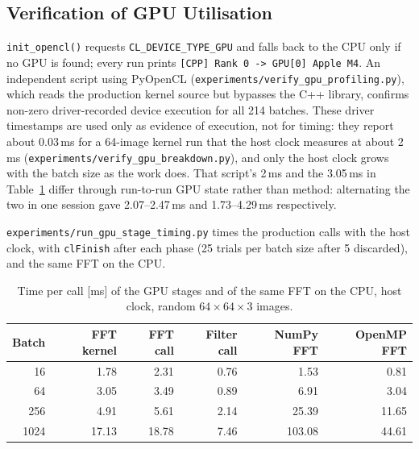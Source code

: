 \documentclass[a4paper,12pt]{report}
\begin{document}
\subsection{Verification of GPU Utilisation}
\label{sec:gpu-idle-check}

\texttt{init\_\discretionary{}{}{}opencl()} requests
\texttt{CL\_\discretionary{}{}{}DEVICE\_\discretionary{}{}{}TYPE\_\discretionary{}{}{}GPU} and falls back to the CPU only if
no GPU is found; every run prints \texttt{[CPP] Rank~0 -> GPU[0]
Apple~M4}. An independent script using PyOpenCL
(\texttt{experiments\slash{}verify\_\discretionary{}{}{}gpu\_\discretionary{}{}{}profiling.py}), which reads
the production kernel source but bypasses the C++ library, confirms
non-zero driver-recorded device execution for all 214 batches. These
driver timestamps are used only as evidence of execution, not for
timing: they report about 0.03\,ms for a 64-image kernel run that the host
clock measures at about 2\,ms
(\texttt{experiments\slash{}verify\_\discretionary{}{}{}gpu\_\discretionary{}{}{}breakdown.py}), and only the
host clock grows with the batch size as the work does. That script's 2\,ms and
the 3.05\,ms in Table~\ref{tab:gpu-device-breakdown} differ through run-to-run
GPU state rather than method: alternating the two in one session gave
2.07--2.47\,ms and 1.73--4.29\,ms respectively.

\texttt{experiments\slash{}run\_\discretionary{}{}{}gpu\_\discretionary{}{}{}stage\_\discretionary{}{}{}timing.py} times the
production calls with the host clock, with \texttt{clFinish} after each
phase (25 trials per batch size after 5 discarded), and the same FFT on
the CPU.

\begin{table}[H]
\centering
\caption{Time per call [ms] of the GPU stages and of the same FFT on the
CPU, host clock, random $64\times64\times3$ images.}
\label{tab:gpu-device-breakdown}
\begin{tabular}{@{}rrrrrr@{}}
\toprule
\textbf{Batch} & \textbf{FFT kernel} & \textbf{FFT call} &
\textbf{Filter call} & \textbf{NumPy FFT} & \textbf{OpenMP FFT} \\
\midrule
16 & 1.78 & 2.31 & 0.76 & 1.53 & 0.81 \\
64 & 3.05 & 3.49 & 0.89 & 6.91 & 3.04 \\
256 & 4.91 & 5.61 & 2.14 & 25.39 & 11.65 \\
1024 & 17.13 & 18.78 & 7.46 & 103.08 & 44.61 \\
\bottomrule
\end{tabular}
\end{table}
\end{document}

